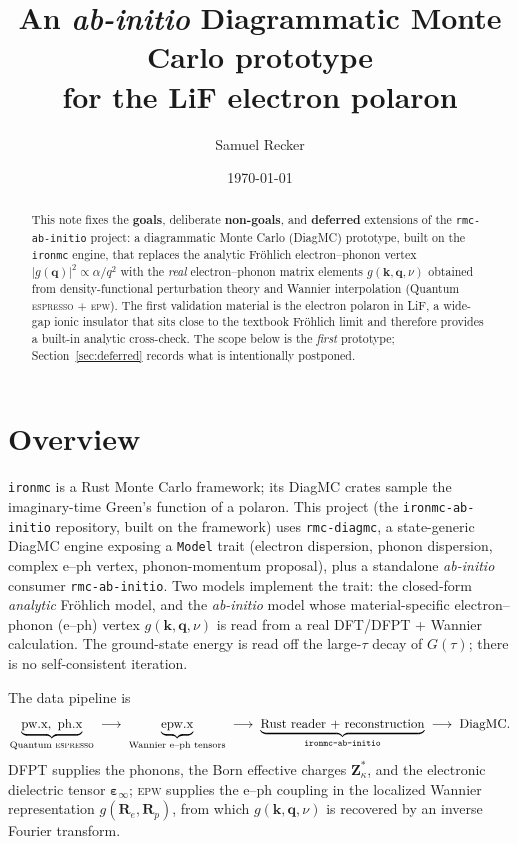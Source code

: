 \documentclass[11pt]{article}
\title{An \emph{ab-initio} Diagrammatic Monte Carlo prototype\\
       for the LiF electron polaron}
\author{Samuel Recker}
\date{\today}
\newcommand{\kv}{\mathbf{k}}
\newcommand{\qv}{\mathbf{q}}
\newcommand{\Rv}{\mathbf{R}}
\newcommand{\Zst}{\mathbf{Z}^{*}}
\newcommand{\epsinf}{\bm{\varepsilon}_{\infty}}
\begin{document}
\maketitle

\begin{abstract}
This note fixes the \textbf{goals}, deliberate \textbf{non-goals}, and
\textbf{deferred} extensions of the \texttt{rmc-ab-initio} project: a diagrammatic
Monte Carlo (DiagMC) prototype, built on the \texttt{ironmc} engine, that replaces the
analytic Fr\"ohlich electron--phonon vertex $|g(\qv)|^{2}\propto\alpha/q^{2}$ with the
\emph{real} electron--phonon matrix elements $g(\kv,\qv,\nu)$ obtained from
density-functional perturbation theory and Wannier interpolation (Quantum \textsc{espresso}
$+$ \textsc{epw}). The first validation material is the electron polaron in LiF, a
wide-gap ionic insulator that sits close to the textbook Fr\"ohlich limit and therefore
provides a built-in analytic cross-check. The scope below is the \emph{first} prototype;
Section~\ref{sec:deferred} records what is intentionally postponed.
\end{abstract}

\section{Overview}
\label{sec:overview}

\texttt{ironmc} is a Rust Monte Carlo framework; its DiagMC crates sample the imaginary-time
Green's function of a polaron. This project (the \texttt{ironmc-ab-initio} repository, built
on the framework) uses \texttt{rmc-diagmc}, a state-generic DiagMC engine exposing a \texttt{Model} trait (electron dispersion, phonon dispersion, complex e--ph
vertex, phonon-momentum proposal), plus a standalone \emph{ab-initio} consumer
\texttt{rmc-ab-initio}. Two models implement the trait: the closed-form \emph{analytic}
Fr\"ohlich model, and the \emph{ab-initio} model whose material-specific electron--phonon
(e--ph) vertex $g(\kv,\qv,\nu)$ is read from a real DFT/DFPT + Wannier calculation. The
ground-state energy is read off the large-$\tau$ decay of $G(\tau)$; there is no
self-consistent iteration.

The data pipeline is
\[
  \underbrace{\text{pw.x},\ \text{ph.x}}_{\text{Quantum \textsc{espresso}}}
  \;\longrightarrow\;
  \underbrace{\text{epw.x}}_{\text{Wannier e--ph tensors}}
  \;\longrightarrow\;
  \underbrace{\text{Rust reader + reconstruction}}_{\texttt{ironmc-ab-initio}}
  \;\longrightarrow\;
  \text{DiagMC}.
\]
DFPT supplies the phonons, the Born effective charges $\Zst_{\kappa}$, and the electronic
dielectric tensor $\epsinf$; \textsc{epw} supplies the e--ph coupling in the localized
Wannier representation $g(\Rv_{e},\Rv_{p})$, from which $g(\kv,\qv,\nu)$ is recovered by an
inverse Fourier transform.
\end{document}
